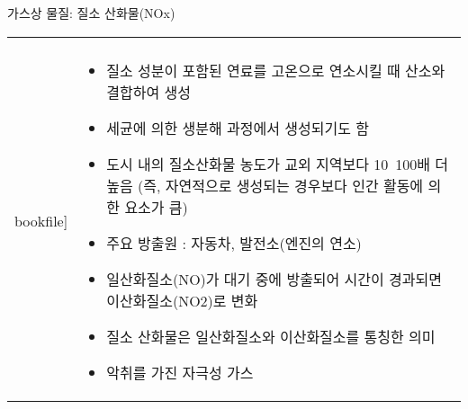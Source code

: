 \begin{frame}[t]{가스상 물질: 질소 산화물(NOx)}
	\begin{tabular}{ll}
		\begin{minipage}[t]{0.3\textwidth}\scriptsize
			\begin{figure}[t]
				\texttt{[image: \\bookfile]}
			\end{figure}
		\end{minipage}	
		&
		\begin{minipage}[t]{0.65\textwidth} \scriptsize	
			\begin{itemize}
				\item 질소 성분이 포함된 연료를 고온으로 연소시킬 때 산소와 결합하여 생성
				\item 세균에 의한 생분해 과정에서 생성되기도 함
				\item 도시 내의 질소산화물 농도가 교외 지역보다 10~100배 더 높음 (즉, 자연적으로 생성되는 경우보다 인간 활동에 의한 요소가 큼)
				\item 주요 방출원 : 자동차, 발전소(엔진의 연소)
				\item 일산화질소(NO)가 대기 중에 방출되어 시간이 경과되면 이산화질소(NO2)로 변화
				\item 질소 산화물은 일산화질소와 이산화질소를 통칭한 의미
				\item 악취를 가진 자극성 가스
					
			\end{itemize}

		\end{minipage}
	\end{tabular}
\end{frame}




